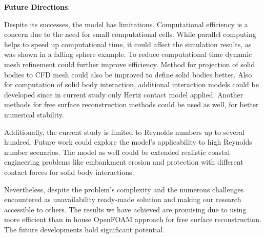 \textbf{Future Directions}:

Despite its successes, the model has limitations. Computational efficiency is a concern due to the need for small computational cells. While parallel computing helps to speed up computational time, it could affect the simulation results, as was shown in a falling sphere example. To reduce computational time dynamic mesh refinement could further improve efficiency.
Method for projection of solid bodies to CFD mesh could also be improved to define solid bodies better. Also for computation of solid body interaction, additional interaction models could be developed since in current study only Hertz contact model applied. Another methods for free surface reconstruction methods could be used as well, for better numerical stability.

Additionally, the current study is limited to Reynolds numbers up to several hundred. Future work could explore the model's applicability to high Reynolds number scenarios. The model as well could be extended realistic coastal engineering problems like embankment erosion and protection with different contact forces for solid body interactions.

Nevertheless, despite the problem's complexity and the numerous challenges encountered as unavailability ready-made solution and making our research accessible to others. The results we have achieved are promising due to using more efficient than in house OpenFOAM approach for free surface reconstruction. The future developments hold significant potential.